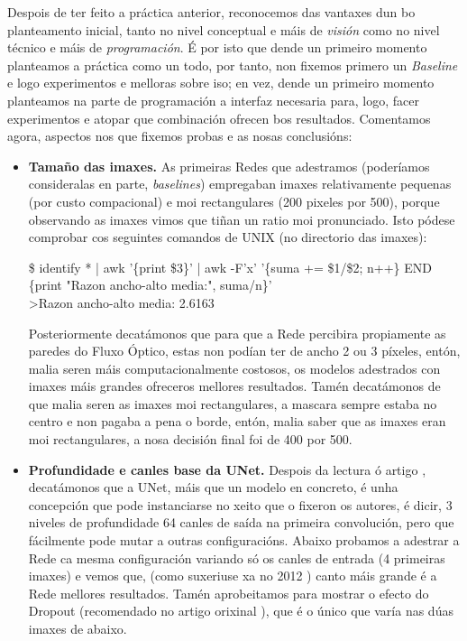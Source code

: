 \documentclass{article}
\begin{document}
Despois de ter feito a práctica anterior, reconocemos das vantaxes dun bo planteamento inicial, tanto no nivel conceptual e máis de \emph{visión} como no nivel técnico e máis de \emph{programación}. É por isto que dende un primeiro momento planteamos a práctica como un todo, por tanto, non fixemos primero un \emph{Baseline} e logo experimentos e melloras sobre iso; en vez, dende un primeiro momento planteamos na parte de programación a interfaz necesaria para, logo, facer experimentos e atopar que combinación ofrecen bos resultados. Comentamos agora, aspectos nos que fixemos probas e as nosas conclusións:

\begin{itemize}
	\item \textbf{Tamaño das imaxes.} As primeiras Redes que adestramos (poderíamos consideralas en parte, \emph{baselines}) empregaban imaxes relativamente pequenas (por custo compacional) e moi rectangulares (200 pixeles por 500), porque observando as imaxes vimos que tiñan un ratio moi pronunciado. Isto pódese comprobar cos seguintes comandos de UNIX (no directorio das imaxes):


\begin{tcolorbox}[colback=gray!10!white, colframe=gray!50!black, 
  boxrule=0.5pt, arc=2pt, left=4pt, right=4pt, top=2pt, bottom=2pt,
  fontupper=\ttfamily\small]
\$ identify * | awk '\{print \$3\}' | awk -F'x' '\{suma += \$1/\$2; n++\} END \{print "Razon ancho-alto media:", suma/n\}' \\
\>>Razon ancho-alto media: 2.6163
\end{tcolorbox}

Posteriormente decatámonos que para que a Rede percibira propiamente as paredes do Fluxo Óptico, estas non podían ter de ancho 2 ou 3 píxeles, entón, malia seren máis computacionalmente costosos, os modelos adestrados con imaxes máis grandes ofreceros mellores resultados. Tamén decatámonos de que malia seren as imaxes moi rectangulares, a mascara sempre estaba no centro e non pagaba a pena o borde, entón, malia saber que as imaxes eran moi rectangulares, a  nosa decisión final foi de 400 por 500. 

\item \textbf{Profundidade e canles base da UNet.} Despois da lectura ó artigo \cite{ronneberger2015u}, decatámonos que a UNet, máis que un modelo en concreto, é unha concepción que pode instanciarse no xeito que o fixeron os autores, é dicir, 3 niveles de profundidade 64 canles de saída na primeira convolución, pero que fácilmente pode mutar a outras configuracións. Abaixo probamos a adestrar a Rede ca mesma configuración variando só os canles de entrada (4 primeiras imaxes) e vemos que, (como suxeriuse xa no 2012 \cite{imagenet}) canto máis grande é a Rede mellores resultados. Tamén aprobeitamos para mostrar o efecto do Dropout \cite{srivastava2014dropout} (recomendado no artigo orixinal \cite{ronneberger2015u}), que é o único que varía nas dúas imaxes de abaixo. 


\end{itemize}
\end{document}
